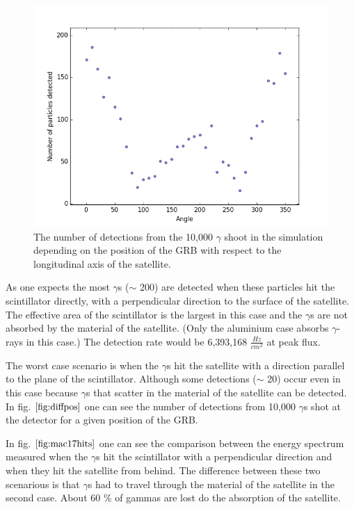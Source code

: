 \documentclass[12pt, a4paper,titlepage]{article}
\numberwithin{equation}{section}
\numberwithin{figure}{section}
\begin{document}
\begin{figure}[h!]
\begin{center}
\includegraphics[width=130.0mm]{images/gammashittingsat.png}
\caption{The number of detections from the 10,000 $\gamma$ shoot in the simulation depending on the position of the GRB with respect to the longitudinal axis of the satellite.}
\label{fig:diffpos}
\end{center}
\end{figure}

As one expects the most $\gamma$s ($\sim$ 200) are detected when these particles hit the scintillator directly, with a perpendicular direction to the surface of the satellite. The effective area of the scintillator is the largest in this case and the $\gamma$s are not absorbed by the material of the satellite. (Only the aluminium case absorbs $\gamma$-rays in this case.) The detection rate would be 6,393,168 $\frac{Hz}{cm^{2}}$ at peak flux.

The worst case scenario is when the $\gamma$s hit the satellite with a direction parallel to the plane of the scintillator. Although some detections ($\sim$ 20) occur even in this case because $\gamma$s that scatter in the material of the satellite can be detected. In fig. $\ref{fig:diffpos}$ one can see the number of detections from 10,000 $\gamma$s shot at the detector for a given position of the GRB. 

In fig. $\ref{fig:mac17hits}$ one can see the comparison between the energy spectrum measured when the $\gamma$s hit the scintillator with a perpendicular direction and when they hit the satellite from behind. The difference between these two scenarious is that $\gamma$s had to travel through the material of the satellite in the second case. About 60 \% of gammas are lost do the absorption of the satellite.
\end{document}

